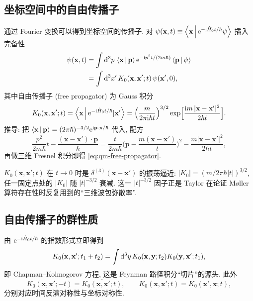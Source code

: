 \subsection{坐标空间中的自由传播子}

通过 Fourier 变换可以得到坐标空间的传播子. 对 $\psi(\mathbf x,t)\equiv\left\langle \mathbf x \,\middle|\, \mathrm{e}^{-\mathrm{i}\hat{H}_0 t/\hbar}\psi \right\rangle$ 插入完备性
\begin{align}
\psi(\mathbf x,t)
&=\int\mathrm{d}^{3}p\,\left\langle \mathbf x \,\middle|\, \mathbf p \right\rangle\mathrm{e}^{-\mathrm{i} p^{2} t/(2m\hbar)}\left\langle \mathbf p \,\middle|\, \psi \right\rangle\nonumber\\
&=\int\mathrm{d}^{3}x'\,K_{0}(\mathbf x,\mathbf x';t)\,\psi(\mathbf x',0),
\end{align}
其中自由传播子 (free propagator) 为 Gauss 积分
\begin{equation}\label{eq:qm-free-propagator}
K_{0}(\mathbf x,\mathbf x';t)
=\left\langle \mathbf x \,\middle|\, \mathrm{e}^{-\mathrm{i}\hat{H}_0 t/\hbar}|\mathbf x' \right\rangle
=\Big(\frac{m}{2\pi\mathrm{i}\hbar t}\Big)^{3/2}
\exp\!\Big[\frac{\mathrm{i} m\,|\mathbf x-\mathbf x'|^{2}}{2\hbar t}\Big].
\end{equation}
推导: 把 $\left\langle \mathbf x \,\middle|\, \mathbf p \right\rangle=(2\pi\hbar)^{-3/2}\mathrm{e}^{\mathrm{i}\mathbf p\cdot\mathbf x/\hbar}$ 代入, 配方
\[\frac{p^{2}}{2m\hbar}t-\frac{(\mathbf x-\mathbf x')\cdot\mathbf p}{\hbar}
=\frac{t}{2m\hbar}\Big(\mathbf p-\frac{m(\mathbf x-\mathbf x')}{t}\Big)^{2}-\frac{m|\mathbf x-\mathbf x'|^{2}}{2\hbar t},\]
再做三维 Fresnel 积分即得 \eqref{eq:qm-free-propagator}.

\begin{remark}
$K_0(\mathbf x,\mathbf x';t)$ 在 $t\to 0$ 时是 $\delta^{(3)}(\mathbf x-\mathbf x')$ 的振荡逼近: $|K_0|=(m/2\pi\hbar|t|)^{3/2}$, 任一固定点处的 $|K_0|$ 随 $|t|^{-3/2}$ 衰减. 这一 $|t|^{-3/2}$ 因子正是 Taylor 在论证 M\o{}ller 算符存在性时反复用到的``三维波包弥散率''.
\end{remark}

\subsection{自由传播子的群性质}

由 $\mathrm{e}^{-\mathrm{i}\hat{H}_0 t/\hbar}$ 的指数形式立即得到
\begin{equation}\label{eq:qm-K0-group}
K_{0}(\mathbf x,\mathbf x';t_1+t_2)=\int\mathrm{d}^{3}y\,K_{0}(\mathbf x,\mathbf y;t_2)K_{0}(\mathbf y,\mathbf x';t_1),
\end{equation}
即 Chapman--Kolmogorov 方程, 这是 Feynman 路径积分``切片''的源头. 此外
\begin{equation}
K_{0}(\mathbf x,\mathbf x';-t)=\overline{K_{0}(\mathbf x,\mathbf x';t)},\qquad
K_{0}(\mathbf x,\mathbf x';t)=K_{0}(\mathbf x',\mathbf x;t),
\end{equation}
分别对应时间反演对称性与坐标对称性.

